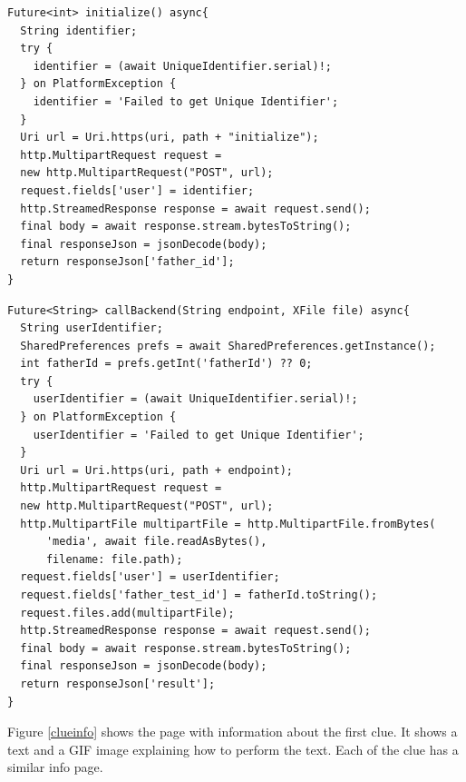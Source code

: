 \begin{lstlisting}[language=flutter, basicstyle=\small, label={initialize}, caption={Code to call the initialize endpoint}, captionpos=b]
Future<int> initialize() async{
  String identifier;
  try {
    identifier = (await UniqueIdentifier.serial)!;
  } on PlatformException {
    identifier = 'Failed to get Unique Identifier';
  }
  Uri url = Uri.https(uri, path + "initialize");
  http.MultipartRequest request =
  new http.MultipartRequest("POST", url);
  request.fields['user'] = identifier;
  http.StreamedResponse response = await request.send();
  final body = await response.stream.bytesToString();
  final responseJson = jsonDecode(body);
  return responseJson['father_id'];
}
\end{lstlisting}

\begin{lstlisting}[language=flutter, basicstyle=\small, label={backendcall}, caption={Code to call the endpoints to proccess each of the clues}, captionpos=b]
Future<String> callBackend(String endpoint, XFile file) async{
  String userIdentifier;
  SharedPreferences prefs = await SharedPreferences.getInstance();
  int fatherId = prefs.getInt('fatherId') ?? 0;
  try {
    userIdentifier = (await UniqueIdentifier.serial)!;
  } on PlatformException {
    userIdentifier = 'Failed to get Unique Identifier';
  }
  Uri url = Uri.https(uri, path + endpoint);
  http.MultipartRequest request =
  new http.MultipartRequest("POST", url);
  http.MultipartFile multipartFile = http.MultipartFile.fromBytes(
      'media', await file.readAsBytes(),
      filename: file.path);
  request.fields['user'] = userIdentifier;
  request.fields['father_test_id'] = fatherId.toString();
  request.files.add(multipartFile);
  http.StreamedResponse response = await request.send();
  final body = await response.stream.bytesToString();
  final responseJson = jsonDecode(body);
  return responseJson['result'];
}
\end{lstlisting}

Figure \ref{clueinfo} shows the page with information about the first clue. It shows a text and a GIF image explaining how to perform the text. Each of the clue has a similar info page.

